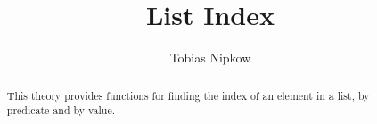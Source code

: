 \documentclass[11pt,a4paper]{article}
\begin{document}
\title{List Index}
\author{Tobias Nipkow}
\maketitle

\begin{abstract}
This theory provides functions for finding the index of an element in a
list, by predicate and by value.
\end{abstract}


\end{document}
